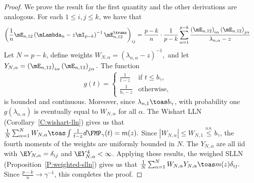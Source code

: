 \begin{proof}
We prove the result for the first quantity and the other derivations are analogous.  For each $1 \leq i, j \leq k$, we have that
\begin{align*}
    \left(
        \frac{1}{n}
        \mE_{n,12}
        \left(
            \mLambda_n
            -
            z \mI_{p-k}
        \right)^{-1}
        \mE_{n,12}^\trans    
    \right)_{ij}
    =
    \frac{p-k}{n}
    \cdot
    \frac{1}{p-k}
    \sum_{\alpha=1}^{p-k}
        \frac{ \left( \mE_{n,12} \right)_{i\alpha}
               \left( \mE_{n,12} \right)_{j\alpha}
             }
             { \lambda_{n,\alpha} - z }
\end{align*}
Let $N = p-k$, define weights 
\(
    W_{N,\alpha} = (\lambda_{n,\alpha} - z)^{-1},
\)
and let
\(
    Y_{N,\alpha} = \left( \mE_{n,12} \right)_{i\alpha}
                   \left( \mE_{n,12} \right)_{j\alpha}.
\)
The function
\[
    g(t) 
    = 
    \begin{cases}
        \frac{1}{t - z} 
            &\text{if $t \leq b_\gamma$,} \\
        \frac{1}{b_\gamma - z}
            &\text{otherwise,}
    \end{cases}
\]
is bounded and continuous.  Moreover, since $\lambda_{n,1} \toas b_\gamma$, with probability one $g(\lambda_{n,\alpha})$ is eventually equal to $W_{N,\alpha}$ for all $\alpha$.  The Wishart LLN (Corollary~\ref{C:wishart-lln}) gives us that
\(
    \frac{1}{N}
    \sum_{\alpha=1}^N W_{N,\alpha}
        \toas
            \int
                \frac{1}{t - z} d\FMP_\gamma(t) = m(z).
\)
Since $| W_{N,\alpha} | \leq W_{N,1} \overset{\text{a.s.}}{\leq} b_\gamma$, the fourth moments of the weights are uniformly bounded in $N$.  
The $Y_{N,\alpha}$ are all iid with $\E Y_{N,\alpha} = \delta_{ij}$ and $\E Y_{N,\alpha}^4 < \infty$.  
Applying these results, the weighed SLLN (Proposition~\ref{P:weighted-slln}) gives us that
\(
    \frac{1}{N}
    \sum_{\alpha=1}^N
        W_{N,\alpha}
        Y_{N,\alpha}
    \toas
        m(z)
        \delta_{ij}.
\)
Since $\frac{p-k}{n} \to \gamma^{-1}$, this completes the proof.
\end{proof}


